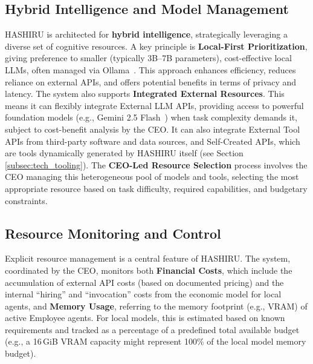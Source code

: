 \documentclass[twocolumn]{article}
\begin{document}
\subsection{Hybrid Intelligence and Model Management}
HASHIRU is architected for \textbf{hybrid intelligence}, strategically leveraging a diverse set of cognitive resources.
A key principle is \textbf{Local-First Prioritization}, giving preference to smaller (typically 3B--7B parameters), cost-effective local LLMs, often managed via Ollama~\cite{ollama}. This approach enhances efficiency, reduces reliance on external APIs, and offers potential benefits in terms of privacy and latency.
The system also supports \textbf{Integrated External Resources}. This means it can flexibly integrate External LLM APIs, providing access to powerful foundation models (e.g., Gemini 2.5 Flash~\cite{gemini25flash}) when task complexity demands it, subject to cost-benefit analysis by the CEO. It can also integrate External Tool APIs from third-party software and data sources, and Self-Created APIs, which are tools dynamically generated by HASHIRU itself (see Section \ref{subsec:tech_tooling}).
The \textbf{CEO-Led Resource Selection} process involves the CEO managing this heterogeneous pool of models and tools, selecting the most appropriate resource based on task difficulty, required capabilities, and budgetary constraints.

\subsection{Resource Monitoring and Control}
\label{subsec:tech_resource_mgmt}
Explicit resource management is a central feature of HASHIRU. The system, coordinated by the CEO, monitors both \textbf{Financial Costs}, which include the accumulation of external API costs (based on documented pricing) and the internal ``hiring'' and ``invocation'' costs from the economic model for local agents, and \textbf{Memory Usage}, referring to the memory footprint (e.g., VRAM) of active Employee agents. For local models, this is estimated based on known requirements and tracked as a percentage of a predefined total available budget (e.g., a 16\,GiB VRAM capacity might represent 100\% of the local model memory budget).
\end{document}
